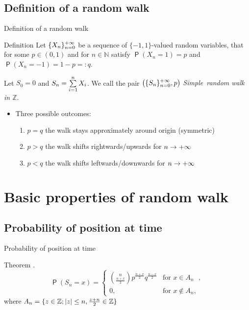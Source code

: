 \documentclass{beamer}
\DeclareMathOperator{\pr}{\mathsf{P}}
\begin{document}
\subsection{Definition of a random walk}
\begin{frame}{Definition of a random walk}
\begin{block}{Definition}
Let $\{X_n\}_{n=0}^{+\infty}$ be a sequence of  \iid $\{-1,1\}$-valued random variables, that for some $p\in(0,1)$ and for $n\in \mathbb{N}$ satisfy $\pr \left( X_n=1 \right) =p$ and $\pr \left( X_n=-1 \right) =1-p=:q$.

Let $S_0=0$ and $S_n=\suma[i][1][n]X_i$. We call the pair $ \left( \{S_n\}_{n=0}^{+\infty}, p \right) $ \emph{Simple~random walk in $\mathbb{Z}$}.
\end{block}
\begin{itemize}
\item<2->Three possible outcomes:
\begin{enumerate}
\item<3-> $p = q$ the walk stays approximately around origin (symmetric)
\item<4-> $p > q$ the walk shifts rightwards/upwards for $n \to {+\infty}$
\item<5-> $p < q$ the walk shifts leftwards/downwards for $n \to {+\infty}$
\end{enumerate}
\end{itemize}
\end{frame}

\section{Basic properties of random walk}
\subsection{Probability of position at time}
\begin{frame}{Probability of position at time}
\begin{block}{Theorem}
   \Lrw.
\[
\pr \left( S_n=x \right) =
\begin{cases}
\binom{n}{\frac{n+x}{2}}p^{\frac{n+x}{2}}q^{\frac{n-x}{2}} & \text{for $x \in A_n$ },\\
0, & \text{for $x \not\in A_n$},
\end{cases}
\]
where $A_n=\{z \in \mathbb{Z}; \left|{z}\right|\leq n, \frac{z+n}{2}\in \mathbb{Z} \}$
\end{block}
\end{frame}
\end{document}
